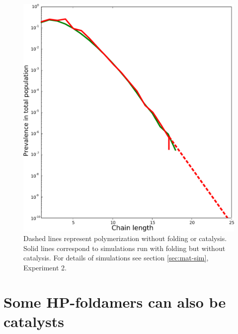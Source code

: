 \documentclass[journal=jacsat,manuscript=article,layout=twocolumn]{achemso}
\begin{document}
\begin{figure}[h!]
  \centering
  \includegraphics[width=\columnwidth]{pictures/flory-and-fold.pdf} 
  \caption{Dashed lines represent polymerization without folding or catalysis. Solid lines 
correspond to simulations run with folding but without catalysis. For details of simulations see 
section \ref{sec:mat-sim}, Experiment 2. }
  \label{fig:sim.flory-fold}
\end{figure}

\section{Some HP-foldamers can also be catalysts}
\end{document}
